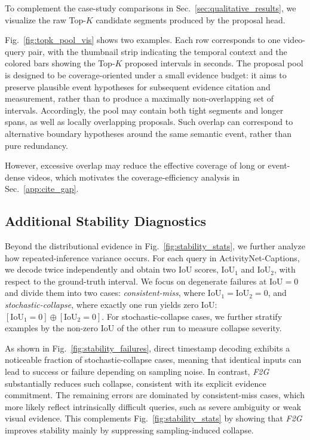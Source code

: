 \documentclass{article}
\theoremstyle{plain}
\theoremstyle{definition}
\theoremstyle{remark}
\begin{document}
To complement the case-study comparisons in Sec.~\ref{sec:qualitative_results}, we visualize the raw Top-$K$ candidate segments produced by the proposal head.

Fig.~\ref{fig:topk_pool_vis} shows two examples.
Each row corresponds to one video-query pair, with the thumbnail strip indicating the temporal context and the colored bars showing the Top-$K$ proposed intervals in seconds.
The proposal pool is designed to be coverage-oriented under a small evidence budget: it aims to preserve plausible event hypotheses for subsequent evidence citation and measurement, rather than to produce a maximally non-overlapping set of intervals.
Accordingly, the pool may contain both tight segments and longer spans, as well as locally overlapping proposals.
Such overlap can correspond to alternative boundary hypotheses around the same semantic event, rather than pure redundancy.

However, excessive overlap may reduce the effective coverage of long or event-dense videos, which motivates the coverage-efficiency analysis in Sec.~\ref{app:cite_gap}.

\subsection{Additional Stability Diagnostics}
\label{app:stability}

Beyond the distributional evidence in Fig.~\ref{fig:stability_stats}, we further analyze how repeated-inference variance occurs.
For each query in ActivityNet-Captions, we decode twice independently and obtain two IoU scores, $\mathrm{IoU}_1$ and $\mathrm{IoU}_2$, with respect to the ground-truth interval.
We focus on degenerate failures at $\mathrm{IoU}=0$ and divide them into two cases:
\emph{consistent-miss}, where $\mathrm{IoU}_1=\mathrm{IoU}_2=0$, and
\emph{stochastic-collapse}, where exactly one run yields zero IoU:
$[\mathrm{IoU}_1=0]\oplus[\mathrm{IoU}_2=0]$.
For stochastic-collapse cases, we further stratify examples by the non-zero IoU of the other run to measure collapse severity.

As shown in Fig.~\ref{fig:stability_failures}, direct timestamp decoding exhibits a noticeable fraction of stochastic-collapse cases, meaning that identical inputs can lead to success or failure depending on sampling noise.
In contrast, \textit{F2G} substantially reduces such collapse, consistent with its explicit evidence commitment.
The remaining errors are dominated by consistent-miss cases, which more likely reflect intrinsically difficult queries, such as severe ambiguity or weak visual evidence.
This complements Fig.~\ref{fig:stability_stats} by showing that \textit{F2G} improves stability mainly by suppressing sampling-induced collapse.
\end{document}
